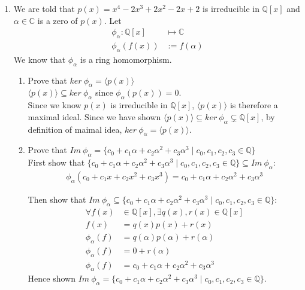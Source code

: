\documentclass[12pt]{article}
\begin{document}
\begin{enumerate}
	\item We are told that $p(x)=x^4-2x^3+ 2x^2-2x+2$ is irreducible in
		$\mathbb{Q}[x]$ and $\alpha \in \mathbb{C}$ is a zero of $p(x)$. Let
		\begin{align*}
			\phi_\alpha: \mathbb{Q}[x] &\mapsto \mathbb{C}\\
			\phi_\alpha(f(x)) &:= f(\alpha)
		\end{align*}
		We know that $\phi_\alpha$ is a ring homomorphism.
		\begin{enumerate}
			\item Prove that $ker\ \phi_\alpha = \langle p(x) \rangle$\\
				$\langle p(x) \rangle \subseteq ker\ \phi_\alpha$ since
				$\phi_\alpha(p(x)) = 0$.\\
				Since we know $p(x)$ is irreducible in $\mathbb{Q}[x]$, $\langle p(x)
				\rangle$ is therefore a maximal ideal. Since we have shown $\langle p(x)
				\rangle \subseteq ker\ \phi_\alpha \subsetneq \mathbb{Q}[x]$, by
				definition of maimal idea, $ker\ \phi_\alpha = \langle p(x) \rangle$.

			\item Prove that $Im\ \phi_\alpha = \{c_0 + c_1 \alpha + c_2 \alpha^2 + c_3
					\alpha^3 \mid c_0, c_1, c_2, c_3 \in \mathbb{Q}\}$\\
					First show that $\{c_0 + c_1 \alpha + c_2 \alpha^2 + c_3
					\alpha^3 \mid c_0, c_1, c_2, c_3 \in \mathbb{Q}\} \subseteq Im\
					\phi_\alpha$:
					\begin{align*}
						\phi_\alpha(c_0 + c_1 x + c_2 x^2 + c_3 x^3) = c_0 + c_1 \alpha +
						c_2 \alpha^2 + c_3 \alpha^3
					\end{align*}

					Then show that $Im\ \phi_\alpha \subseteq \{c_0 + c_1 \alpha + c_2
						\alpha^2 + c_3 \alpha^3 \mid c_0, c_1, c_2, c_3 \in \mathbb{Q}\}$:
						\begin{align*}
							\forall f(x) &\in \mathbb{Q}[x], \exists q(x), r(x) \in  \mathbb{Q}[x]\\
							f(x) &= q(x)p(x) + r(x)\\
							\phi_\alpha(f) &= q(\alpha)p(\alpha) + r(\alpha)\\
							\phi_\alpha(f) &= 0 + r(\alpha)\\
							\phi_\alpha(f) &= c_0 + c_1 \alpha + c_2 \alpha^2 + c_3 \alpha^3
						\end{align*}
					Hence shown $Im\ \phi_\alpha = \{c_0 + c_1 \alpha + c_2 \alpha^2 + c_3
					\alpha^3 \mid c_0, c_1, c_2, c_3 \in \mathbb{Q}\}$.


\end{enumerate}
\end{enumerate}
\end{document}
